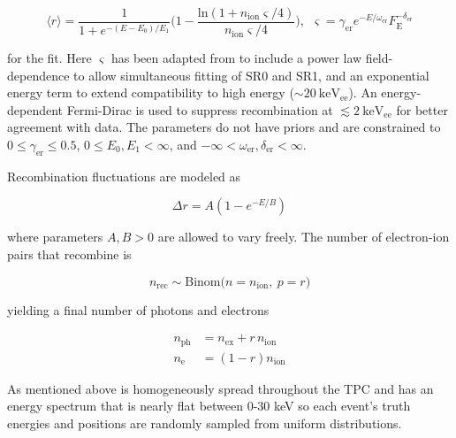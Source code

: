 \begin{equation}
\langle r \rangle = \frac{1}{1 + e^{-(E - E_0) / E_1}}
\bigg( 1 - \frac{\mathrm{ln}(1 + n_{\mathrm{ion}} \varsigma / 4)}{n_{\mathrm{ion}} \varsigma / 4} \bigg)
,\ \ \varsigma = \gamma_{\mathrm{er}} e^{-E / \omega_{\mathrm{er}}} F_{\mathrm{E}}^{-\delta_{\mathrm{er}}}
\label{eq:er_nr_calibrations_parameter_determ_ti}
\end{equation}

\noindent for the fit.  Here $\varsigma$ has been adapted from  to include a power law field-dependence to allow
simultaneous fitting of SR0 and SR1, and an exponential energy term to extend compatibility to high energy
(${\sim} 20\ \mathrm{keV_{ee}}$).  An energy-dependent Fermi-Dirac is used to suppress recombination at
$\lesssim 2\ \mathrm{keV_{ee}}$ for better agreement with data.  The parameters do not have priors and are constrained to
$0 \leq \gamma_{\mathrm{er}} \leq 0.5$, $0 \leq E_0, E_1 < \infty$, and
$-\infty < \omega_{\mathrm{er}}, \delta_{\mathrm{er}} < \infty$.

Recombination fluctuations are modeled as

\begin{equation}
\Delta r = A(1 - e^{-E/B})
\label{eq:er_nr_calibrations_parameter_determ_er_rec_fluctuations}
\end{equation}

\noindent where parameters $A,B > 0$ are allowed to vary freely.  The number of electron-ion pairs that recombine is

\begin{equation}
n_{\mathrm{rec}} \sim \mathrm{Binom} \big(n = n_{\mathrm{ion}},\ p = r \big)
\end{equation}

\noindent yielding a final number of photons and electrons

\begin{subequations}
\begin{align}
n_{\mathrm{ph}} &= n_{\mathrm{ex}} + r\, n_{\mathrm{ion}} \\
n_{\mathrm{e}} &= (1 - r) n_{\mathrm{ion}}
\end{align}
\end{subequations}

\noindent  As mentioned above  is homogeneously spread throughout the TPC and has an energy spectrum that is nearly
flat between 0-30 keV so each event's truth energies and positions are randomly sampled from uniform distributions.



